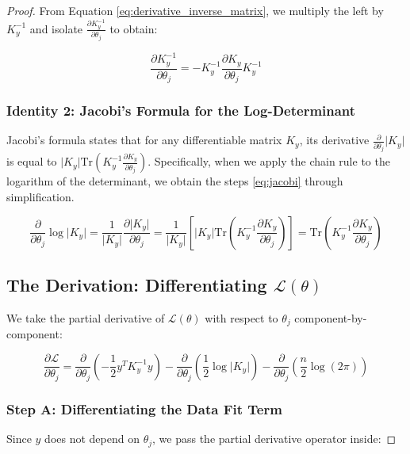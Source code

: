 \documentclass[12pt,oneside]{report}
\theoremstyle{definition}
\theoremstyle{remark}
\begin{document}
\begin{proof}
From Equation \ref{eq:derivative_inverse_matrix}, we multiply the left by $K_y^{-1}$ and isolate $\frac{\partial K_y^{-1}}{\partial \theta_j}$ to obtain:

$$\frac{\partial K_y^{-1}}{\partial \theta_j} = -K_y^{-1} \frac{\partial K_y}{\partial \theta_j} K_y^{-1}$$

\subsubsection{Identity 2: Jacobi's Formula for the Log-Determinant}
Jacobi’s formula states that for any differentiable matrix $K_y$, its derivative $\frac{\partial}{\partial \theta_j} \vert{}K_y\vert{}$ is equal to $ \vert{}K_y\vert{}\text{Tr}\left( K_y^{-1} \frac{\partial K_y}{\partial \theta_j} \right)$. Specifically, when we apply the chain rule to the logarithm of the determinant, we obtain the steps \ref{eq:jacobi} through simplification.

\begin{equation}\frac{\partial}{\partial \theta_j} \log \vert{}K_y\vert{} = \frac{1}{\vert{}K_y\vert{}} \frac{\partial \vert{}K_y\vert{}}{\partial \theta_j} = \frac{1}{\vert{}K_y\vert{}} \left[ \vert{}K_y\vert{} \text{Tr}\left( K_y^{-1} \frac{\partial K_y}{\partial \theta_j} \right) \right] = \text{Tr}\left( K_y^{-1} \frac{\partial K_y}{\partial \theta_j} \right)\label{eq:jacobi}\end{equation}


\subsection{The Derivation: Differentiating $\mathcal{L}(\theta)$}

We take the partial derivative of $\mathcal{L}(\theta)$ with respect to $\theta_j$ component-by-component:

$$\frac{\partial \mathcal{L}}{\partial \theta_j} = \frac{\partial}{\partial \theta_j} \left( -\frac{1}{2} y^T K_y^{-1} y \right) - \frac{\partial}{\partial \theta_j} \left( \frac{1}{2} \log \vert{}K_y\vert{} \right) - \frac{\partial}{\partial \theta_j} \left( \frac{n}{2} \log (2\pi) \right)$$


\subsubsection{Step A: Differentiating the Data Fit Term}
Since $y$ does not depend on $\theta_j$, we pass the partial derivative operator inside:


\end{proof}
\end{document}
